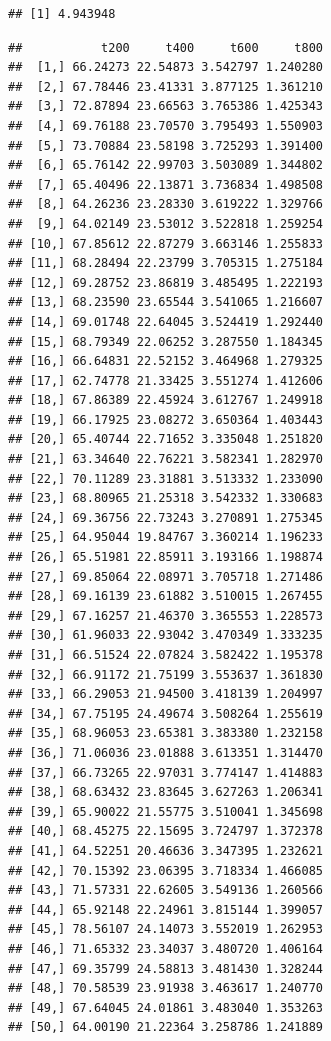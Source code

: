 \documentclass[
  11pt,
]{article}
\begin{document}
\begin{verbatim}
## [1] 4.943948
\end{verbatim}

\begin{verbatim}
##           t200     t400     t600     t800
##  [1,] 66.24273 22.54873 3.542797 1.240280
##  [2,] 67.78446 23.41331 3.877125 1.361210
##  [3,] 72.87894 23.66563 3.765386 1.425343
##  [4,] 69.76188 23.70570 3.795493 1.550903
##  [5,] 73.70884 23.58198 3.725293 1.391400
##  [6,] 65.76142 22.99703 3.503089 1.344802
##  [7,] 65.40496 22.13871 3.736834 1.498508
##  [8,] 64.26236 23.28330 3.619222 1.329766
##  [9,] 64.02149 23.53012 3.522818 1.259254
## [10,] 67.85612 22.87279 3.663146 1.255833
## [11,] 68.28494 22.23799 3.705315 1.275184
## [12,] 69.28752 23.86819 3.485495 1.222193
## [13,] 68.23590 23.65544 3.541065 1.216607
## [14,] 69.01748 22.64045 3.524419 1.292440
## [15,] 68.79349 22.06252 3.287550 1.184345
## [16,] 66.64831 22.52152 3.464968 1.279325
## [17,] 62.74778 21.33425 3.551274 1.412606
## [18,] 67.86389 22.45924 3.612767 1.249918
## [19,] 66.17925 23.08272 3.650364 1.403443
## [20,] 65.40744 22.71652 3.335048 1.251820
## [21,] 63.34640 22.76221 3.582341 1.282970
## [22,] 70.11289 23.31881 3.513332 1.233090
## [23,] 68.80965 21.25318 3.542332 1.330683
## [24,] 69.36756 22.73243 3.270891 1.275345
## [25,] 64.95044 19.84767 3.360214 1.196233
## [26,] 65.51981 22.85911 3.193166 1.198874
## [27,] 69.85064 22.08971 3.705718 1.271486
## [28,] 69.16139 23.61882 3.510015 1.267455
## [29,] 67.16257 21.46370 3.365553 1.228573
## [30,] 61.96033 22.93042 3.470349 1.333235
## [31,] 66.51524 22.07824 3.582422 1.195378
## [32,] 66.91172 21.75199 3.553637 1.361830
## [33,] 66.29053 21.94500 3.418139 1.204997
## [34,] 67.75195 24.49674 3.508264 1.255619
## [35,] 68.96053 23.65381 3.383380 1.232158
## [36,] 71.06036 23.01888 3.613351 1.314470
## [37,] 66.73265 22.97031 3.774147 1.414883
## [38,] 68.63432 23.83645 3.627263 1.206341
## [39,] 65.90022 21.55775 3.510041 1.345698
## [40,] 68.45275 22.15695 3.724797 1.372378
## [41,] 64.52251 20.46636 3.347395 1.232621
## [42,] 70.15392 23.06395 3.718334 1.466085
## [43,] 71.57331 22.62605 3.549136 1.260566
## [44,] 65.92148 22.24961 3.815144 1.399057
## [45,] 78.56107 24.14073 3.552019 1.262953
## [46,] 71.65332 23.34037 3.480720 1.406164
## [47,] 69.35799 24.58813 3.481430 1.328244
## [48,] 70.58539 23.91938 3.463617 1.240770
## [49,] 67.64045 24.01861 3.483040 1.353263
## [50,] 64.00190 21.22364 3.258786 1.241889
\end{verbatim}
\end{document}
